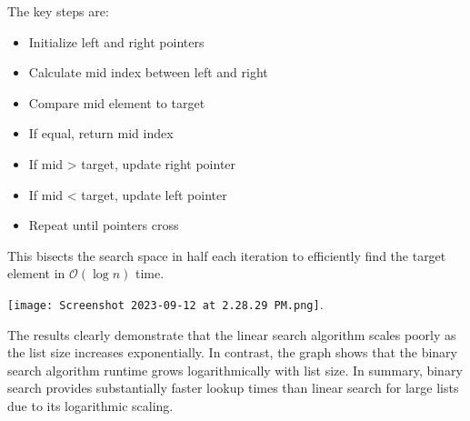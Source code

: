 \documentclass{hw}
\begin{document}
\begin{solution}
\begin{algorithm}
\end{algorithm}

The key steps are:

\begin{itemize}
\item Initialize left and right pointers
\item Calculate mid index between left and right
\item Compare mid element to target

\item If equal, return mid index
\item If mid > target, update right pointer
\item If mid < target, update left pointer

\item Repeat until pointers cross
\end{itemize}

This bisects the search space in half each iteration to efficiently find the target element in $\mathcal{O}(\log n)$ time.



\end{solution}
\texttt{[image: Screenshot 2023-09-12 at 2.28.29 PM.png]}.

The results clearly demonstrate that the linear search algorithm scales poorly as the list size increases exponentially. In contrast, the graph shows that the binary search algorithm runtime grows logarithmically with list size. In summary, binary search provides substantially faster lookup times than linear search for large lists due to its logarithmic scaling.
\end{document}
